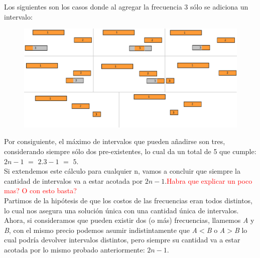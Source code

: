 Los siguientes son los casos donde al agregar la frecuencia $3$ s\'olo se adiciona un intervalo:
  \begin{figure}[h!]
   \begin{center}
 	\includegraphics[scale=0.2]{imagenes/ej2/secuencias/Paso2/todos1.png}
   \end{center}
 \end{figure}

Por consiguiente, el m\'aximo de intervalos que pueden a\~nadirse son tres, considerando siempre s\'olo dos pre-existentes, lo cual da un total de 5 que cumple: $2n-1$ $=$ $2$.$3-1$ $=$ $5$.\\


Si extendemos este c\'alculo para cualquier n, vamos a concluir que siempre la cantidad de intervalos va a estar acotada por $2n-1$.\textcolor{red}{Habra que explicar un poco mas? O con esto basta?}\\


Partimos de la hip\'otesis de que los costos de las frecuencias eran todos distintos, lo cual nos asegura una soluci\'on \'unica con una cantidad \'unica de intervalos. Ahora, si consideramos que pueden existir dos (o m\'as) frecuencias, llamemos \emph{A} y \emph{B}, con el mismo precio podemos asumir indistintamente que \emph{A$<$B} o \emph{A$>$B} lo cual podr\'ia devolver intervalos distintos, pero siempre su cantidad va a estar acotada por lo mismo probado anteriormente: $2n-1$.\\

